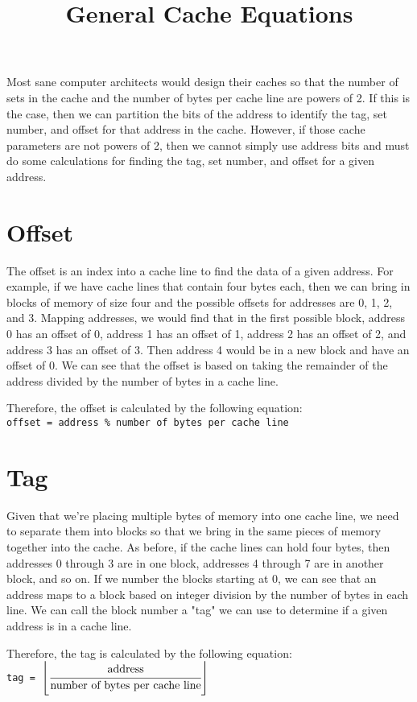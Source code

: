 \documentclass[11pt]{article}
\title{General Cache Equations}
\date{}
\author{}
\begin{document}
\maketitle

Most sane computer architects would design their caches so that the number of sets in the cache and the number of bytes per cache line are powers of 2.
If this is the case, then we can partition the bits of the address to identify the tag, set number, and offset for that address in the cache.
However, if those cache parameters are not powers of 2, then we cannot simply use address bits and must do some calculations for finding the tag, set number, and offset for a given address.

\section*{Offset}
The offset is an index into a cache line to find the data of a given address.
For example, if we have cache lines that contain four bytes each, then we can bring in blocks of memory of size four and the possible offsets for addresses are 0, 1, 2, and 3.
Mapping addresses, we would find that in the first possible block, address 0 has an offset of 0, address 1 has an offset of 1, address 2 has an offset of 2, and address 3 has an offset of 3.
Then address 4 would be in a new block and have an offset of 0. We can see that the offset is based on taking the remainder of the address divided by the number of bytes in a cache line.

Therefore, the offset is calculated by the following equation:\\
\texttt{offset = address \% number of bytes per cache line}

\section*{Tag}
Given that we're placing multiple bytes of memory into one cache line, we need to separate them into blocks so that we bring in the same pieces of memory together into the cache.
As before, if the cache lines can hold four bytes, then addresses 0 through 3 are in one block, addresses 4 through 7 are in another block, and so on.
If we number the blocks starting at 0, we can see that an address maps to a block based on integer division by the number of bytes in each line.
We can call the block number a "tag" we can use to determine if a given address is in a cache line.

Therefore, the tag is calculated by the following equation:\\ 
\texttt{tag = $\left\lfloor\cfrac{\text{address}}{\text{number of bytes per cache line}}\right\rfloor$}
\end{document}
